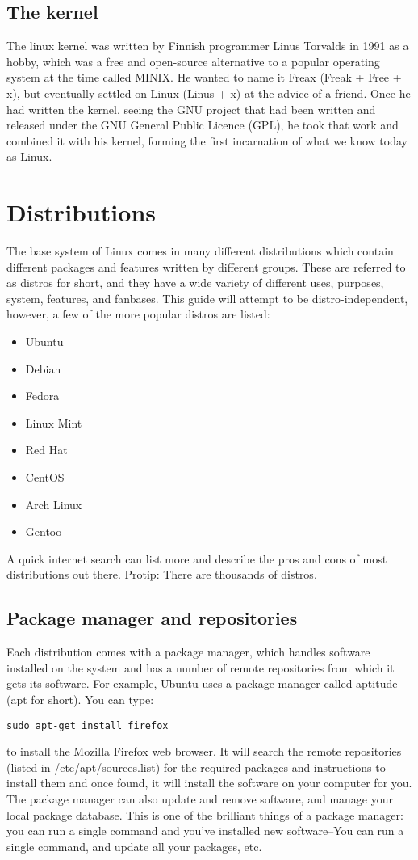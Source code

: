 \documentclass{article}
\begin{document}
\subsection{The kernel}
The linux kernel was written by Finnish programmer Linus Torvalds in 1991 as a hobby, which was a free and open-source alternative to a popular operating system at the time called MINIX. He wanted to name it Freax (Freak + Free + x), but eventually settled on Linux (Linus + x) at the advice of a friend. Once he had written the kernel, seeing the GNU project that had been written and released under the GNU General Public Licence (GPL), he took that work and combined it with his kernel, forming the first incarnation of what we know today as Linux.

\section{Distributions}
The base system of Linux comes in many different distributions which contain different packages and features written by different groups. These are referred to as distros for short, and they have a wide variety of different uses, purposes, system, features, and fanbases.
This guide will attempt to be distro-independent, however, a few of the more popular distros are listed:
\begin{itemize}
\item Ubuntu
\item Debian
\item Fedora
\item Linux Mint
\item Red Hat
\item CentOS
\item Arch Linux
\item Gentoo
\end{itemize}
A quick internet search can list more and describe the pros and cons of most distributions out there. Protip: There are thousands of distros.

\subsection{Package manager and repositories}
Each distribution comes with a package manager, which handles software installed on the system and has a number of remote repositories from which it gets its software. For example, Ubuntu uses a package manager called aptitude (apt for short). You can type:
\begin{verbatim}
sudo apt-get install firefox
\end{verbatim}
to install the Mozilla Firefox web browser. It will search the remote repositories (listed in /etc/apt/sources.list) for the required packages and instructions to install them and once found, it will install the software on your computer for you. The package manager can also update and remove software, and manage your local package database. This is one of the brilliant things of a package manager: you can run a single command and you've installed new software--You can run a single command, and update all your packages, etc.
\end{document}
